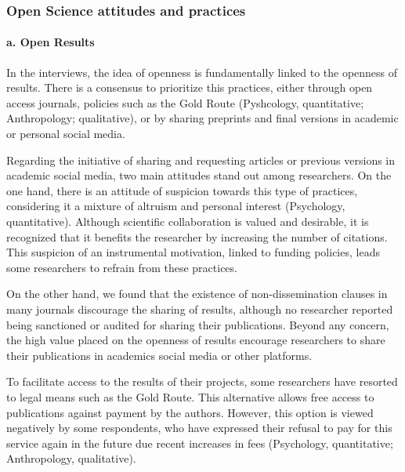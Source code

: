 \documentclass[
  letterpaper,
  DIV=11,
  numbers=noendperiod]{scrartcl}
\let\oldparagraph\paragraph
\renewcommand{\paragraph}[1]{\oldparagraph{#1}\mbox{}}
\begin{document}
\hypertarget{open-science-attitudes-and-practices}{%
\subsubsection{\texorpdfstring{\textbf{Open Science attitudes and
practices}}{Open Science attitudes and practices}}\label{open-science-attitudes-and-practices}}

\hypertarget{a.-open-results}{%
\paragraph{a. Open Results}\label{a.-open-results}}

In the interviews, the idea of openness is fundamentally linked to the
openness of results. There is a consensus to prioritize this practices,
either through open access journals, policies such as the Gold Route
(Pyshcology, quantitative; Anthropology; qualitative), or by sharing
preprints and final versions in academic or personal social media.

Regarding the initiative of sharing and requesting articles or previous
versions in academic social media, two main attitudes stand out among
researchers. On the one hand, there is an attitude of suspicion towards
this type of practices, considering it a mixture of altruism and
personal interest (Psychology, quantitative). Although scientific
collaboration is valued and desirable, it is recognized that it benefits
the researcher by increasing the number of citations. This suspicion of
an instrumental motivation, linked to funding policies, leads some
researchers to refrain from these practices.

On the other hand, we found that the existence of non-dissemination
clauses in many journals discourage the sharing of results, although no
researcher reported being sanctioned or audited for sharing their
publications. Beyond any concern, the high value placed on the openness
of results encourage researchers to share their publications in
academics social media or other platforms.

To facilitate access to the results of their projects, some researchers
have resorted to legal means such as the Gold Route. This alternative
allows free access to publications against payment by the authors.
However, this option is viewed negatively by some respondents, who have
expressed their refusal to pay for this service again in the future due
recent increases in fees (Psychology, quantitative; Anthropology,
qualitative).
\end{document}
